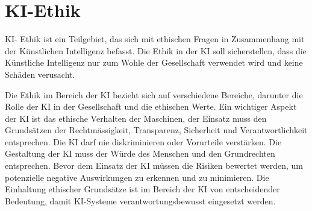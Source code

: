 \section{KI-Ethik}
\label{sec:data}

KI- Ethik ist ein Teilgebiet, das sich mit ethischen Fragen in Zusammenhang mit der Künstlichen
Intelligenz befasst. Die Ethik in der KI soll sicherstellen, dass die Künstliche Intelligenz nur zum
Wohle der Gesellschaft verwendet wird und keine Schäden verusacht.

Die Ethik im Bereich der KI bezieht sich auf verschiedene Bereiche, darunter die Rolle der KI in
der Gesellschaft und die ethischen Werte. Ein wichtiger Aspekt der KI ist das ethische Verhalten
der Maschinen, der Einsatz muss den Grundsätzen der Rechtmässigkeit, Transparenz, Sicherheit
und Verantwortlichkeit entsprechen. Die KI darf nie diskriminieren oder Vorurteile verstärken.
Die Gestaltung der KI muss der Würde des Menschen und den Grundrechten entsprechen. Bevor
dem Einsatz der KI müssen die Risiken bewertet werden, um potenzielle negative Auswirkungen
zu erkennen und zu minimieren. Die Einhaltung ethischer Grundsätze ist im Bereich der KI von
entscheidender Bedeutung, damit KI-Systeme verantwortungsbewusst eingesetzt werden.

